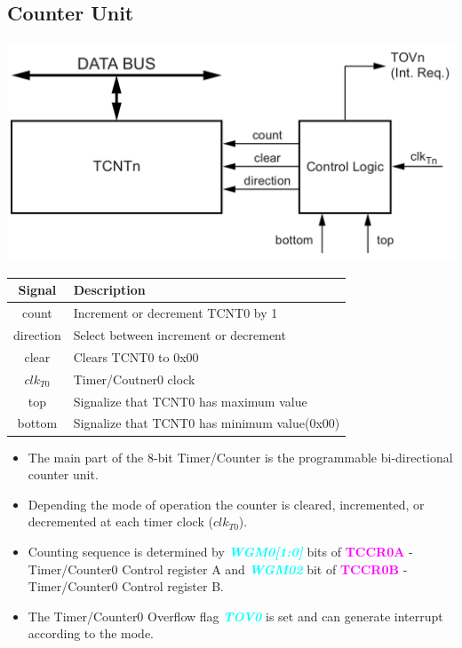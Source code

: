 \documentclass{article}
\newcommand{\bitFormat}[1]{\emph{\textbf{\textcolor{cyan}{#1}}}}
\newcommand{\regFormat}[1]{\textbf{\textcolor{magenta}{#1}}}
\begin{document}
\subsection{Counter Unit}
\begin{minipage}{0.5\textwidth}
    \includegraphics[width=1\textwidth]{Timer0CounterUnit.png}
\end{minipage}
\begin{minipage}{0.45\textwidth}
    \begin{tabular}{c|p{5.5cm}}
        \textbf{Signal} & \textbf{Description}\\
        \hline  
        count & Increment or decrement TCNT0 by 1\\
        direction & Select between increment or decrement\\
        clear & Clears TCNT0 to 0x00\\
        $clk_{T0}$ & Timer/Coutner0 clock\\
        top & Signalize that TCNT0 has maximum value\\
        bottom & Signalize that TCNT0 has minimum value(0x00)\\
    \end{tabular}
\end{minipage}
\begin{itemize}
    \item The main part of the 8-bit Timer/Counter is the programmable bi-directional counter unit.
    \item Depending the mode of operation the counter is cleared, incremented, or decremented at each timer clock ($clk_{T0}$).
    \item Counting sequence is determined by \bitFormat{WGM0[1:0]} bits of \regFormat{TCCR0A} -Timer/Counter0 Control register A and \bitFormat{WGM02} bit of \regFormat{TCCR0B} - Timer/Counter0 Control register B.
    \item The Timer/Counter0 Overflow flag \bitFormat{TOV0} is set and can generate interrupt according to the mode.
\end{itemize}
\end{document}
